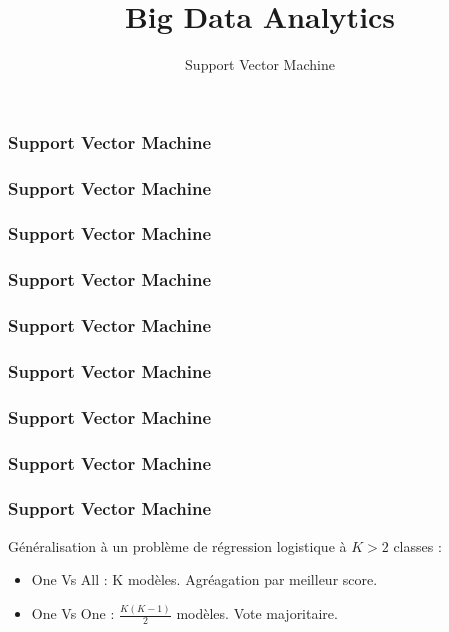 \documentclass{formation}
\title{Big Data Analytics}
\subtitle{Support Vector Machine}
\begin{document}
\maketitle

\begin{frame}
  \frametitle{Support Vector Machine}
\end{frame}

\begin{frame}
  \frametitle{Support Vector Machine}
\end{frame}

\begin{frame}
  \frametitle{Support Vector Machine}
\end{frame}

\begin{frame}
  \frametitle{Support Vector Machine}
\end{frame}

\begin{frame}
  \frametitle{Support Vector Machine}
\end{frame}

\begin{frame}
  \frametitle{Support Vector Machine}
\end{frame}

\begin{frame}
  \frametitle{Support Vector Machine}
\end{frame}

\begin{frame}
  \frametitle{Support Vector Machine}
\end{frame}

\begin{frame}
  \frametitle{Support Vector Machine}
  Généralisation à un problème de régression logistique à $K>2$ classes :
  \begin{itemize}
  \item One Vs All : K modèles. Agréagation par meilleur score.
  \item One Vs One : $\frac{K(K-1)}{2}$ modèles. Vote majoritaire.
  \end{itemize}
\end{frame}
\end{document}

